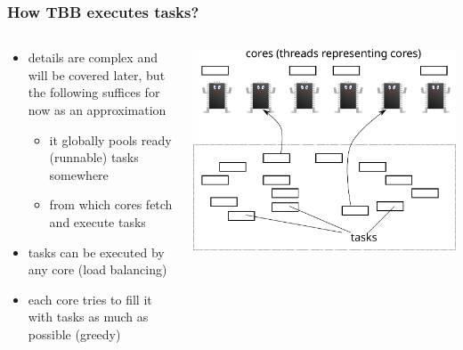 \documentclass[12pt,dvipdfmx]{beamer}
\begin{document}
\begin{frame}
\frametitle{How TBB executes tasks?}
\begin{columns}
  \begin{column}{0.6\textwidth}
\begin{itemize}
\item details are complex and will be covered later,
  but the following suffices for now as an approximation
  \begin{itemize}
  \item it globally pools ready (runnable) tasks somewhere
  \item from which cores fetch and execute tasks
  \end{itemize}

\item tasks can be executed by any core (load balancing)
\item each core tries to fill it with tasks as much as possible (greedy)
\end{itemize}
  \end{column}
  \begin{column}{0.4\textwidth}
\begin{center}
\includegraphics[width=\textwidth]{out/pdf/svg/tbb_approximated.pdf}  
\end{center}
\end{column}
\end{columns}
\end{frame}
\end{document}
